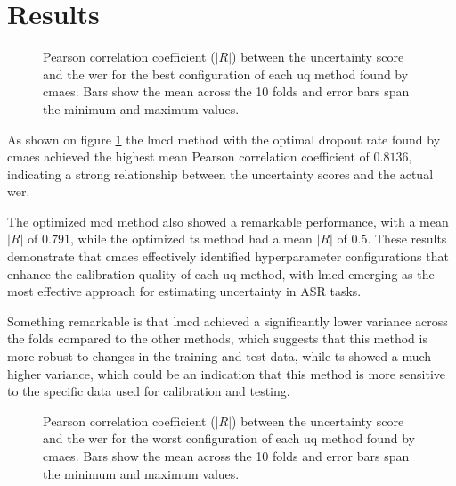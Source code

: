 \documentclass[11pt]{article}
\begin{document}
\section{Results}

\begin{figure}[htbp]
    \centering
    \resizebox{0.9\linewidth}{!}{}
    \caption{Pearson correlation coefficient ($|R|$) between the uncertainty score and the \acrshort{wer} for the best configuration of each \acrshort{uq} method found by \acrshort{cmaes}. Bars show the mean across the 10 folds and error bars span the minimum and maximum values.}
    \label{fig:best_results}
\end{figure}


As shown on figure \ref{fig:best_results} the \acrshort{lmcd} method with the optimal dropout rate found by \acrshort{cmaes} achieved the highest mean Pearson correlation coefficient of $0.8136$, indicating a strong relationship between the uncertainty scores and the actual \acrshort{wer}. 

The optimized \acrshort{mcd} method also showed a remarkable performance, with a mean $|R|$ of $0.791$, while the optimized \acrshort{ts} method had a mean $|R|$ of $0.5$. These results demonstrate that \acrshort{cmaes} effectively identified hyperparameter configurations that enhance the calibration quality of each \acrshort{uq} method, with \acrshort{lmcd} emerging as the most effective approach for estimating uncertainty in ASR tasks.

Something remarkable is that \acrshort{lmcd} achieved a significantly lower variance across the folds compared to the other methods, which suggests that this method is more robust to changes in the training and test data, while \acrshort{ts} showed a much higher variance, which could be an indication that this method is more sensitive to the specific data used for calibration and testing.

\begin{figure}[htbp]
    \centering
    \resizebox{0.9\linewidth}{!}{}
    \caption{Pearson correlation coefficient ($|R|$) between the uncertainty score and the \acrshort{wer} for the worst configuration of each \acrshort{uq} method found by \acrshort{cmaes}. Bars show the mean across the 10 folds and error bars span the minimum and maximum values.}
    \label{fig:worst_results}
\end{figure}
\end{document}
